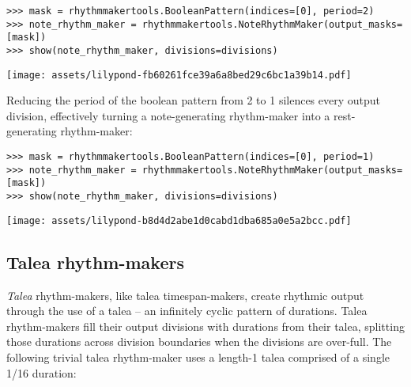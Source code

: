 \begin{comment}
<abjad>
mask = rhythmmakertools.BooleanPattern(indices=[0], period=2)
note_rhythm_maker = rhythmmakertools.NoteRhythmMaker(output_masks=[mask])
show(note_rhythm_maker, divisions=divisions)
</abjad>
\end{comment}

\begin{singlespacing}
\vspace{-0.5\baselineskip}
\begin{lstlisting}
>>> mask = rhythmmakertools.BooleanPattern(indices=[0], period=2)
>>> note_rhythm_maker = rhythmmakertools.NoteRhythmMaker(output_masks=[mask])
>>> show(note_rhythm_maker, divisions=divisions)
\end{lstlisting}
\noindent\texttt{[image: assets/lilypond-fb60261fce39a6a8bed29c6bc1a39b14.pdf]}
\end{singlespacing}

\noindent Reducing the period of the boolean pattern from 2 to 1 silences every
output division, effectively turning a note-generating rhythm-maker into a
rest-generating rhythm-maker:

\begin{comment}
<abjad>
mask = rhythmmakertools.BooleanPattern(indices=[0], period=1)
note_rhythm_maker = rhythmmakertools.NoteRhythmMaker(output_masks=[mask])
show(note_rhythm_maker, divisions=divisions)
</abjad>
\end{comment}

\begin{singlespacing}
\vspace{-0.5\baselineskip}
\begin{lstlisting}
>>> mask = rhythmmakertools.BooleanPattern(indices=[0], period=1)
>>> note_rhythm_maker = rhythmmakertools.NoteRhythmMaker(output_masks=[mask])
>>> show(note_rhythm_maker, divisions=divisions)
\end{lstlisting}
\noindent\texttt{[image: assets/lilypond-b8d4d2abe1d0cabd1dba685a0e5a2bcc.pdf]}
\end{singlespacing}

\subsection{Talea rhythm-makers}

\emph{Talea} rhythm-makers, like talea timespan-makers, create rhythmic output through
the use of a talea -- an infinitely cyclic pattern of durations. Talea
rhythm-makers fill their output divisions with durations from their talea,
splitting those durations across division boundaries when the divisions are
over-full. The following trivial talea rhythm-maker uses a length-1 talea
comprised of a single 1/16 duration:

